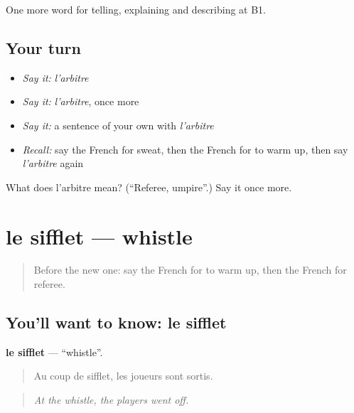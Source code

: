 \begin{grammarlens}[title={What you've built}]
One more word for telling, explaining and describing at B1.
\end{grammarlens}

\subsection*{Your turn}
\begin{itemize}
\raggedright
  \item \emph{Say it:} \emph{l'arbitre}
  \item \emph{Say it:} \emph{l'arbitre}, once more
  \item \emph{Say it:} a sentence of your own with \emph{l'arbitre}
  \item \emph{Recall:} say the French for sweat, then the French for to warm up, then say \emph{l'arbitre} again
\end{itemize}

\begin{tcolorbox}[breakable,colback=teal!4,colframe=teal!35!black,title={Before you move on}]
What does l'arbitre mean? (\textquotedblleft{}Referee, umpire\textquotedblright{}.) Say it once more.
\end{tcolorbox}
\section[le sifflet]{le sifflet — whistle}

\label{lesson:FR-C505-sifflet}



\begin{quote}
Before the new one: say the French for to warm up, then the French for referee.
\end{quote}

\subsection*{You'll want to know: le sifflet}
\textbf{le sifflet} — \textquotedblleft{}whistle\textquotedblright{}.

\begin{quote}
Au coup de sifflet, les joueurs sont sortis.
\end{quote}

\begin{quote}
\emph{At the whistle, the players went off.}
\end{quote}

